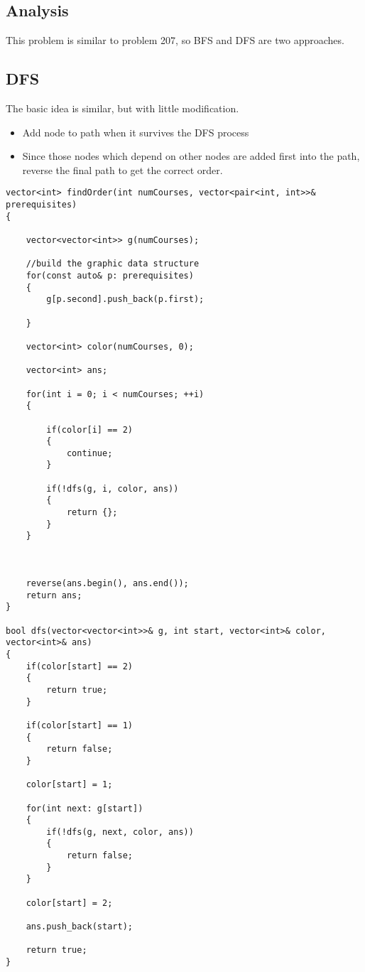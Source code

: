 \subsection{Analysis}
This problem is similar to problem 207, so BFS and DFS are two approaches.
\subsection{DFS}
The basic idea is similar, but with little modification. 
\begin{itemize}
    \item Add node to path when it survives the DFS process
    \item Since those nodes which depend on other nodes are added first into the path, reverse the final path to get the correct order.
\end{itemize}
\setcounter{lstlisting}{0}
\begin{lstlisting}[style=customc, caption={DFS}]
vector<int> findOrder(int numCourses, vector<pair<int, int>>& prerequisites) 
{

    vector<vector<int>> g(numCourses);

    //build the graphic data structure
    for(const auto& p: prerequisites)
    {
        g[p.second].push_back(p.first);

    }

    vector<int> color(numCourses, 0);

    vector<int> ans;

    for(int i = 0; i < numCourses; ++i)
    {

        if(color[i] == 2)
        {
            continue;
        }

        if(!dfs(g, i, color, ans))
        {
            return {};
        }
    }



    reverse(ans.begin(), ans.end());
    return ans;
}

bool dfs(vector<vector<int>>& g, int start, vector<int>& color, vector<int>& ans)
{
    if(color[start] == 2)
    {
        return true;
    }

    if(color[start] == 1)
    {
        return false;
    }

    color[start] = 1;

    for(int next: g[start])
    {
        if(!dfs(g, next, color, ans))
        {
            return false;
        }
    }

    color[start] = 2;

    ans.push_back(start);

    return true;
}
\end{lstlisting}
